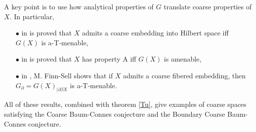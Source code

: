 A key point is to use how analytical properties of $G$ translate coarse properties of $X$. In particular, 
\begin{itemize}
\item[$\bullet$] in \cite{SkTuYu} is proved that $X$ admits a coarse embedding into Hilbert space iff $G(X)$ is a-T-menable, 
\item[$\bullet$] in \cite{SkTuYu} is proved that $X$ has property A iff $G(X)$ is amenable, 
\item[$\bullet$] in \cite{FinnSellFibred}, M. Finn-Sell shows that if $X$ admits a coarse fibered embedding, then $G_\partial = G(X)_{|\partial \beta X}$ is a-T-menable. 
\end{itemize}
All of these results, combined with theorem \ref{Tu}, give examples of coarse spaces satisfying the Coarse Baum-Connes conjecture and the Boundary Coarse Baum-Connes conjecture.
















